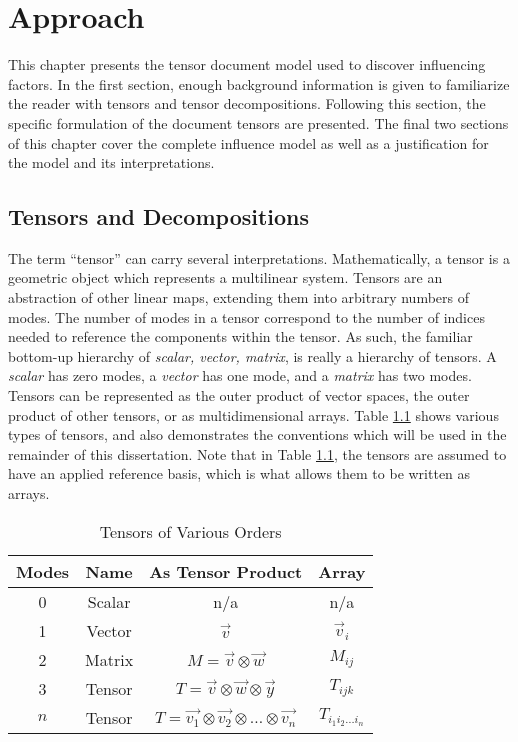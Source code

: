 \documentclass[../ut-dissertation.tex]{subfiles}
\begin{document}
\chapter{Approach}
This chapter presents the tensor document model used to discover
influencing factors.  In the first section, enough background
information is given to familiarize the reader with tensors and tensor
decompositions. Following this section, the specific formulation of
the document tensors are presented.  The final two sections of this
chapter cover the complete influence model as well as a justification
for the model and its interpretations.

\section{Tensors and Decompositions}
The term ``tensor'' can carry several interpretations.
Mathematically, a tensor is a geometric object which represents
a multilinear system.  Tensors are an abstraction of other linear
maps, extending them into arbitrary numbers of modes.  The number of
modes in a tensor correspond to the number of indices needed to
reference the components within the tensor.  As such, the familiar
bottom-up hierarchy of {\em scalar, vector, matrix}, is really 
a hierarchy of tensors.  A {\em scalar} has zero modes, a {\em vector}
has one mode, and a {\em matrix} has two modes.  Tensors can be
represented as the outer product of vector spaces, the outer product
of other tensors, or as multidimensional arrays. Table
\ref{tab:tensor} shows various types of tensors, and also demonstrates
the conventions which will be used in the remainder of this
dissertation.  Note that in Table \ref{tab:tensor}, the tensors are
assumed to have an applied reference basis, which is what allows them
to be written as arrays.  


\begin{table}
    \centering
    \begin{tabular}{c|c|c|c}
        {\bf Modes} & {\bf Name} & {\bf As Tensor Product} & {\bf Array}\\
        \hline
        0 & Scalar & n/a & n/a\\
        1 & Vector & $\vec{v}$ & $\vec{v}_i$\\
        2 & Matrix & $M=\vec{v} \otimes \vec{w}$ & $M_{ij}$\\
        3 & Tensor & $T=\vec{v} \otimes \vec{w} \otimes \vec{y}$ & $T_{ijk}$ \\
        $n$ & Tensor & $T=\vec{v_1} \otimes \vec{v_2} \otimes \ldots \otimes \vec{v_n}$ & $T_{i_1i_2 \ldots i_n}$\\
    \end{tabular}

    \caption{Tensors of Various Orders}
    \label{tab:tensor}
\end{table}
\end{document}
